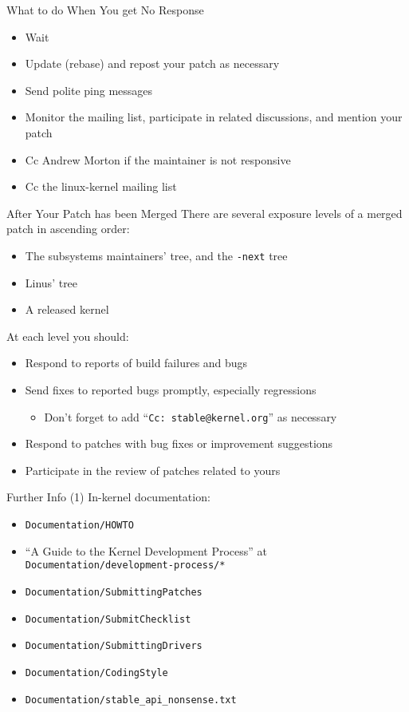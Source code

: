 \documentclass{beamer}
\begin{document}
\begin{frame}{What to do When You get No Response}
  \begin{itemize}
  \item Wait
  \item Update (rebase) and repost your patch as necessary
  \item Send polite ping messages
  \item Monitor the mailing list, participate in related discussions,
    and mention your patch
  \item Cc Andrew Morton if the maintainer is not responsive
  \item Cc the linux-kernel mailing list
  \end{itemize}
\end{frame}

\begin{frame}{After Your Patch has been Merged}
  There are several exposure levels of a merged patch in ascending
  order:
  \begin{itemize}
  \item The subsystems maintainers' tree, and the \texttt{-next} tree
  \item Linus' tree
  \item A released kernel
  \end{itemize}

  At each level you should:
  \begin{itemize}
  \item Respond to reports of build failures and bugs
  \item Send fixes to reported bugs promptly, especially regressions
    \begin{itemize}
    \item Don't forget to add ``\texttt{Cc:~stable@kernel.org}'' as
      necessary
    \end{itemize}
  \item Respond to patches with bug fixes or improvement suggestions
  \item Participate in the review of patches related to yours
  \end{itemize}
\end{frame}

\begin{frame}{Further Info (1)}
  In-kernel documentation:
  \begin{itemize}
  \item \texttt{Documentation/HOWTO}
  \item ``A Guide to the Kernel Development Process'' at
    \texttt{Documentation/development-process/*}
  \item \texttt{Documentation/SubmittingPatches}
  \item \texttt{Documentation/SubmitChecklist}
  \item \texttt{Documentation/SubmittingDrivers}
  \item \texttt{Documentation/CodingStyle}
  \item \texttt{Documentation/stable\_api\_nonsense.txt}
  \end{itemize}
\end{frame}
\end{document}
